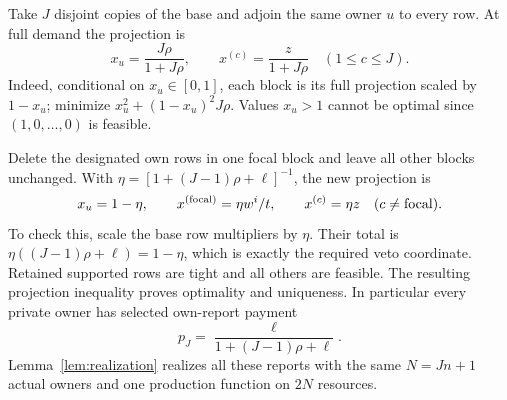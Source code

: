 \documentclass[11pt]{article}
\theoremstyle{definition}
\theoremstyle{remark}
\begin{document}
Take $J$ disjoint copies of the base and adjoin the same owner $u$ to
every row.  At full demand the projection is
\begin{equation}
 x_u=\frac{J\rho}{1+J\rho},\qquad
 x^{(c)}=\frac{z}{1+J\rho}\quad(1\le c\le J).
 \label{eq:veto-full}
\end{equation}
Indeed, conditional on $x_u\in[0,1]$, each block is its full projection
scaled by $1-x_u$; minimize $x_u^2+(1-x_u)^2J\rho$.  Values $x_u>1$
cannot be optimal since $(1,0,\ldots,0)$ is feasible.

Delete the designated own rows in one focal block and leave all other
blocks unchanged.  With
$\eta=[1+(J-1)\rho+\ell]^{-1}$, the new projection is
\begin{equation}
 x_u=1-\eta,\qquad x^{(\rm focal)}=\eta w^i/t,
 \qquad x^{(c)}=\eta z\quad(c\ne\mathrm{focal}).
 \label{eq:veto-focal}
\end{equation}
To check this, scale the base row multipliers by $\eta$.  Their total
is $\eta((J-1)\rho+\ell)=1-\eta$, which is exactly the required veto
coordinate.  Retained supported rows are tight and all others are
feasible.  The resulting projection inequality proves optimality and
uniqueness.  In particular every private owner has selected own-report
payment
\begin{equation}
 p_J=\frac{\ell}{1+(J-1)\rho+\ell}.
 \label{eq:private-selected}
\end{equation}
Lemma~\ref{lem:realization} realizes all these reports with the same
$N=Jn+1$ actual owners and one production function on $2N$ resources.
\end{document}
